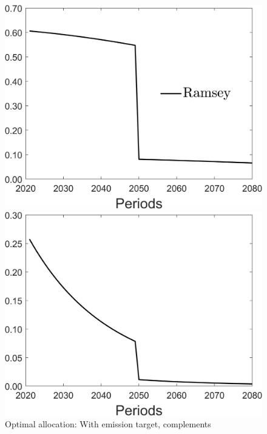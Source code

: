\begin{figure}[h!!]
	\centering
	\caption{Optimal allocation: With emission target, complements }\label{fig:optallo_comp_onlyR_target}
	\begin{minipage}[]{0.32\textwidth}
		\includegraphics[width=1\textwidth]{../../codding_model/Own/figures/Rep_agent/staticonlyRam_separate_c_periods59_eppsilon0.40_zeta1.40_Ad08_Ac04_thetac0.70_thetad0.56_HetGrowth1_tauul0.181_util0_withtarget1_lgd1.png}
	\end{minipage}
	\begin{minipage}[]{0.32\textwidth}
		\includegraphics[width=1\textwidth]{../../codding_model/Own/figures/Rep_agent/staticonlyRam_separate_hh_periods59_eppsilon0.40_zeta1.40_Ad08_Ac04_thetac0.70_thetad0.56_HetGrowth1_tauul0.181_util0_withtarget1_lgd0.png}

\end{minipage}
\end{figure}
